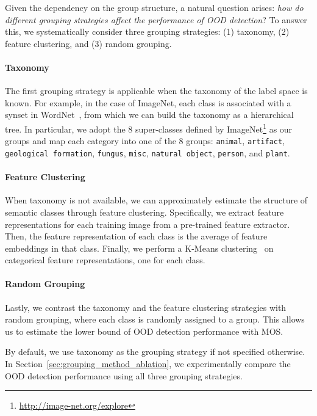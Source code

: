 \documentclass[final]{cvpr}
\begin{document}
Given the dependency on the group structure, a natural question arises: \emph{how do different grouping strategies affect the performance of OOD detection}? To answer this, we systematically consider three grouping strategies: (1) taxonomy, (2) feature clustering, and (3) random grouping. 

\vspace{-0.4cm}
\paragraph{Taxonomy} The first grouping strategy is applicable when the taxonomy of the label space is known. For example, in the case of ImageNet, each class is associated with a synset in WordNet~\cite{miller1995wordnet}, from which we can build the taxonomy as a hierarchical tree. In particular, we adopt the 8 super-classes defined by ImageNet\footnote{\url{http://image-net.org/explore}} as our groups and map each category into one of the 8 groups: \texttt{animal}, \texttt{artifact}, \texttt{geological formation}, \texttt{fungus}, \texttt{misc}, \texttt{natural object}, \texttt{person}, and \texttt{plant}.



\vspace{-0.4cm}
\paragraph{Feature Clustering} When taxonomy is not available, we can approximately estimate the structure of semantic classes through feature clustering. Specifically, we extract feature representations for each training image from a pre-trained feature extractor. Then, the feature representation of each class is the average of feature embeddings in that class. Finally, we perform a K-Means clustering~\cite{macqueen1967some} on categorical feature representations, one for each class.


\vspace{-0.4cm}
\paragraph{Random Grouping} Lastly, we contrast the taxonomy and the feature clustering strategies with random grouping, where each class is randomly assigned to a group. This allows us to estimate the lower bound of OOD detection performance with MOS.

By default, we use taxonomy as the grouping strategy if not specified otherwise. In Section~\ref{sec:grouping_method_ablation}, we experimentally compare the OOD detection performance using all three grouping strategies.  
\end{document}

